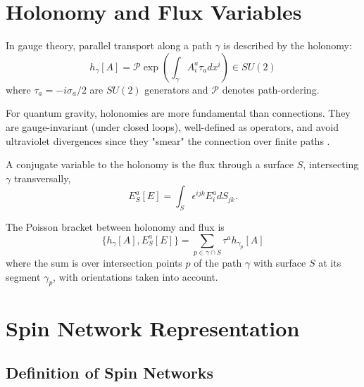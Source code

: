 \documentclass[11pt,a4paper]{article}
\theoremstyle{definition}
\begin{document}
	
	\section{Holonomy and Flux Variables}
	
	
	In gauge theory, parallel transport along a path $\gamma$ is described by the holonomy:
	\begin{equation}
		h_\gamma[A] = \mathcal{P}\exp\left(\int_\gamma A^a_i \tau_a dx^i\right) \in SU(2)
		\label{eq:holonomy}
	\end{equation}
	where $\tau_a = -i\sigma_a/2$ are $SU(2)$ generators and $\mathcal{P}$ denotes path-ordering.
	
	For quantum gravity, holonomies are more fundamental than connections. They are gauge-invariant (under closed loops), well-defined as operators, and avoid ultraviolet divergences since they "smear" the connection over finite paths \cite{rovelli2004}.
	
	
	A conjugate variable to the holonomy is the flux through a surface $S$, intersecting $\gamma$ transversally,
	\begin{equation}
		E_S^a[E] = \int_S \epsilon^{ijk} E^a_i dS_{jk} .
		\label{eq:flux}
	\end{equation}
	
	The Poisson bracket between holonomy and flux is 
	\begin{equation}
		\{h_\gamma[A], E_S^a[E]\} = \sum_{p \in \gamma \cap S} \tau^a h_{\gamma_p}[A]
		\label{eq:holonomy_flux_poisson}
	\end{equation}
	where the sum is over intersection points $p$ of the path $\gamma$ with surface $S$ at its segment $\gamma_p$, with	 orientations taken into account.
	
	\section{Spin Network Representation}
	
	\subsection{Definition of Spin Networks}
	
\end{document}
